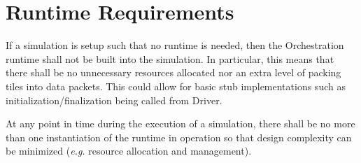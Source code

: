 \documentclass{article}
\begin{document}
%
%
%
%
%
%
%

\section{Runtime Requirements}
\begin{req}
If a simulation is setup such that no runtime is needed, then the Orchestration
runtime shall not be built into the simulation.  In particular, this means that
there shall be no unnecessary resources allocated nor an extra level of packing
tiles into data packets.  This could allow for basic stub implementations such
as initialization/finalization being called from Driver.
\end{req}

\begin{req}
At any point in time during the execution of a simulation, there shall be no more
than one instantiation of the runtime in operation so that design complexity can
be minimized (\textit{e.g.} resource allocation and management).
\end{req}
\end{document}
